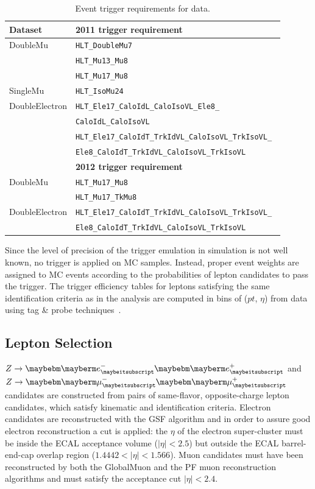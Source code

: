 \begin{table}[htb!]
\caption{ 
Event trigger requirements for data.
}
\label{triggers}
\vspace*{\medskipamount}
\begin{center}
\small
\begin{tabular}{|l l|}
\hline
\bf{Dataset} & \bf{2011 trigger requirement}   \\
\hline
DoubleMu & \tt{HLT\_DoubleMu7} \\
 & \tt{HLT\_Mu13\_Mu8} \\
 & \tt{HLT\_Mu17\_Mu8} \\ \hline
SingleMu & \tt{HLT\_IsoMu24} \\ \hline
DoubleElectron & \tt{HLT\_Ele17\_CaloIdL\_CaloIsoVL\_Ele8\_} \\ 
& \tt{CaloIdL\_CaloIsoVL} \\
 & \tt{HLT\_Ele17\_CaloIdT\_TrkIdVL\_CaloIsoVL\_TrkIsoVL\_} \\
 & \tt{Ele8\_CaloIdT\_TrkIdVL\_CaloIsoVL\_TrkIsoVL} \\ \hline
\bf{} & \bf{2012 trigger requirement}   \\
\hline
DoubleMu & \tt{HLT\_Mu17\_Mu8}\\
 & \tt{HLT\_Mu17\_TkMu8} \\ \hline
DoubleElectron & \tt{HLT\_Ele17\_CaloIdT\_TrkIdVL\_CaloIsoVL\_TrkIsoVL\_} \\ 
& \tt{Ele8\_CaloIdT\_TrkIdVL\_CaloIsoVL\_TrkIsoVL} \\
\hline
\end{tabular}
\end{center}
\end{table}
Since the level of precision of the trigger emulation in simulation is not well known, no trigger is applied on MC samples. Instead, proper event weights are assigned to MC events according to the probabilities of lepton candidates to pass the trigger. The trigger efficiency tables for leptons satisfying the same identification criteria as in the analysis are computed in bins of ($pt$, $\eta$) from data using tag \& probe techniques~\cite{CMS-AN-2011-399}. 

\subsection{Lepton Selection}
$Z \rightarrow \Pem \Pep$ and $Z \rightarrow \Pgmm \Pgmp$ candidates are constructed from pairs of same-flavor, opposite-charge lepton candidates, which satisfy kinematic and identification criteria. Electron candidates are reconstructed with the GSF algorithm and in order to assure good electron reconstruction a cut is applied: the $\eta$ of the electron super-cluster must be inside the ECAL acceptance volume ($|\eta|<2.5$) but outside the ECAL barrel-end-cap overlap region ($1.4442<|\eta|<1.566$). Muon candidates must have been reconstructed by both the GlobalMuon and the PF muon reconstruction algorithms and must satisfy the acceptance cut $|\eta|<2.4$.

